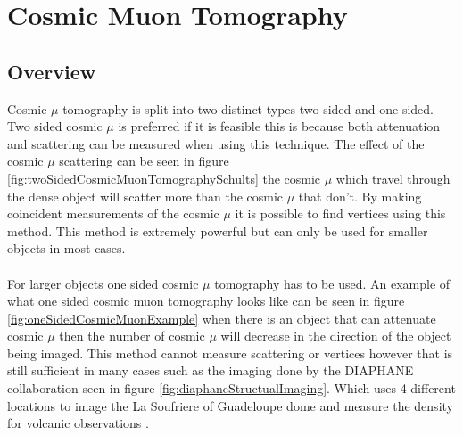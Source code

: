 
\chapter{Cosmic Muon Tomography}

\ifpdf
    \graphicspath{{Chapter5/Figs/Raster/}{Chapter5/Figs/PDF/}{Chapter5/Figs/}}
\else
    \graphicspath{{Chapter5/Figs/Vector/}{Chapter5/Figs/}}
\fi

\section{Overview}
Cosmic $\mu$ tomography is split into two distinct types two sided and one sided. Two sided cosmic $\mu$ is preferred if it is feasible this is because both attenuation and scattering can be measured when using this technique. The effect of the cosmic $\mu$ scattering can be seen in figure \ref{fig:twoSidedCosmicMuonTomographySchults} the cosmic $\mu$ which travel through the dense object will scatter more than the cosmic $\mu$ that don't. By making coincident measurements of the cosmic $\mu$ it is possible to find vertices using this method. This method is extremely powerful but can only be used for smaller objects in most cases. 
\\\\ For larger objects one sided cosmic $\mu$ tomography has to be used. An example of what one sided cosmic muon tomography looks like can be seen in figure \ref{fig:oneSidedCosmicMuonExample} when there is an object that can attenuate cosmic $\mu$ then the number of cosmic $\mu$ will decrease in the direction of the object being imaged. This method cannot measure scattering or vertices however that is still sufficient in many cases such as the imaging done by the DIAPHANE collaboration seen in figure  \ref{fig:diaphaneStructualImaging}. Which uses 4 different locations to image the La Soufriere of Guadeloupe dome and measure the density for volcanic observations \cite{Marteau_2017}.
